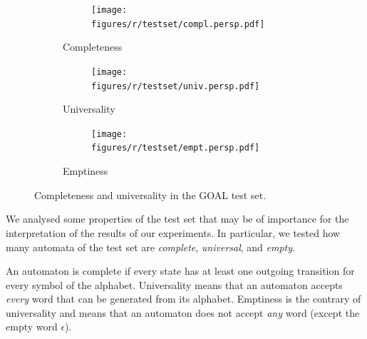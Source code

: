 \renewcommand{\tabcolsep}{0.05cm}
\renewcommand{\arraystretch}{1.05}
\begin{figure}[htb!]
  \centering
  \begin{subfigure}{\textwidth}
    \begin{subtable}{0.47\textwidth}
    
    \end{subtable}
    \hfill
    \begin{subfigure}{0.52\textwidth}
    \texttt{[image: figures/r/testset/compl.persp.pdf]}
    \end{subfigure}
  \caption{Completeness}
  \end{subfigure}

 \begin{subfigure}{\textwidth}
    \begin{subtable}{0.47\textwidth}
    
    \end{subtable}
    \hfill
    \begin{subfigure}{0.52\textwidth}
    \texttt{[image: figures/r/testset/univ.persp.pdf]}
    \end{subfigure}
  \caption{Universality}
  \end{subfigure}

  \begin{subfigure}{\textwidth}
    \begin{subtable}{0.47\textwidth}
    
    \end{subtable}
    \hfill
    \begin{subfigure}{0.52\textwidth}
    \texttt{[image: figures/r/testset/empt.persp.pdf]}
    \end{subfigure}
  \caption{Emptiness}
  \end{subfigure}
\caption{Completeness and universality in the GOAL test set.}
\label{4_testset_analysis}
\end{figure}
\tablestyle  %

We analysed some properties of the \goal{} test set that may be of importance for the interpretation of the results of our experiments. In particular, we tested how many automata of the \goal{} test set are \textit{complete}, \textit{universal}, and \textit{empty}.

An automaton is complete if every state has at least one outgoing transition for every symbol of the alphabet. Universality means that an automaton accepts \textit{every} word that can be generated from its alphabet. Emptiness is the contrary of universality and means that an automaton does not accept \textit{any} word (except the empty word $\epsilon$).

